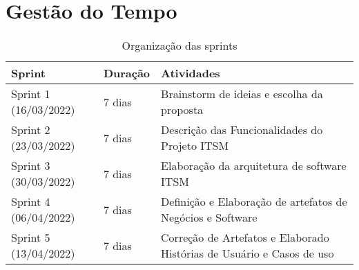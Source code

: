 \section{Gestão do Tempo}
    \begin{table}[h] %
        \centering\footnotesize
        \caption{\label{sprints} Organização das sprints}
        \begin{tabular}{|l|l|p{9cm}|}
            \hline
            Sprint & Duração & Atividades \\ \hline
            Sprint 1 (16/03/2022) & 7 dias & Brainstorm de ideias e escolha da proposta \\ \hline
            Sprint 2 (23/03/2022) & 7 dias & Descrição das Funcionalidades do Projeto ITSM \\ \hline
            Sprint 3 (30/03/2022) & 7 dias & Elaboração da arquitetura de software ITSM \\ \hline
            Sprint 4 (06/04/2022) & 7 dias & Definição e Elaboração de artefatos de Negócios e Software \\ \hline
            Sprint 5 (13/04/2022) & 7 dias & Correção de Artefatos e Elaborado Histórias de Usuário e Casos de uso\\ \hline
        \end{tabular}
    \end{table}
